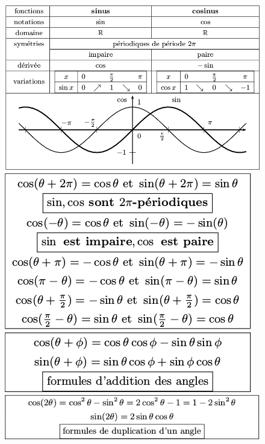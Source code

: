 \documentclass[a4paper,10pt]{book}
\begin{document}
\begin{figure}[!h] \begin{center}
\includegraphics[scale=0.524]{images/010.png}
\includegraphics[scale=0.7]{images/013.png}
\includegraphics[scale=0.7]{images/011.png}
\includegraphics[scale=0.7]{images/012.png}
\end{center} \end{figure}

\newpage
\end{document}

